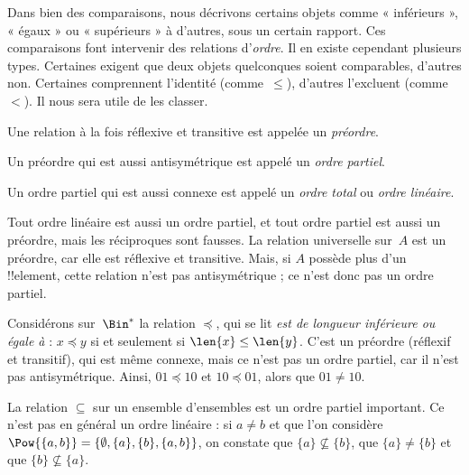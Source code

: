 \documentclass[../../../include/open-logic-section]{subfiles}
\begin{document}

\begin{explain}
Dans bien des comparaisons, nous décrivons certains objets comme
« inférieurs », « égaux » ou « supérieurs » à d’autres, sous un certain
rapport. Ces comparaisons font intervenir des relations d’\emph{ordre}.
Il en existe cependant plusieurs types. Certaines exigent que deux objets
quelconques soient comparables, d’autres non. Certaines comprennent
l’identité (comme~$\le$), d’autres l’excluent (comme~$<$).
Il nous sera utile de les classer.
\end{explain}

\begin{defn}[Préordre]
Une relation à la fois réflexive et transitive est appelée un
\emph{préordre}.
\end{defn}

\begin{defn}
Un préordre qui est aussi antisymétrique est appelé un \emph{ordre partiel}.
\end{defn}

\begin{defn}
Un ordre partiel qui est aussi connexe est appelé un \emph{ordre total}
ou \emph{ordre linéaire}.
\end{defn}

\begin{ex}
Tout ordre linéaire est aussi un ordre partiel, et tout ordre partiel
est aussi un préordre, mais les réciproques sont fausses.
La relation universelle sur~$A$ est un préordre, car elle est réflexive
et transitive. Mais, si $A$ possède plus d’un !!{element}, cette relation
n’est pas antisymétrique ; ce n’est donc pas un ordre partiel.
\end{ex}

\begin{ex}
Considérons sur~$\Bin^*$ la relation $\preccurlyeq$, qui se lit
\emph{est de longueur inférieure ou égale à} : $x \preccurlyeq y$ si et
seulement si $\len{x} \le \len{y}$. C’est un préordre (réflexif et
transitif), qui est même connexe, mais ce n’est pas un ordre partiel,
car il n’est pas antisymétrique. Ainsi, $01 \preccurlyeq 10$ et
$10 \preccurlyeq 01$, alors que $01 \neq 10$.
\end{ex}

\begin{ex}
La relation $\subseteq$ sur un ensemble d’ensembles est un ordre partiel
important. Ce n’est pas en général un ordre linéaire : si $a \neq b$ et
que l’on considère $\Pow{\{a, b\}} = \{\emptyset, \{a\}, \{b\}, \{a,b\}\}$,
on constate que $\{a\} \nsubseteq \{b\}$, que $\{a\} \neq \{b\}$ et que
$\{b\} \nsubseteq \{a\}$.
\end{ex}
\end{document}
